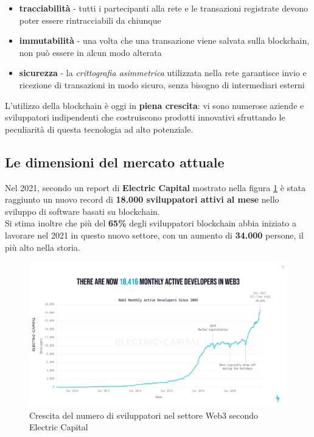 \documentclass[12pt,a4paper]{report}
\begin{document}
\begin{itemize}
  \item \textbf{tracciabilità} - tutti i partecipanti alla rete e le transazioni registrate devono poter essere rintracciabili da chiunque
  \item \textbf{immutabilità} - una volta che una transazione viene salvata sulla blockchain, non può essere in alcun modo alterata
  \item \textbf{sicurezza} - la \textit{crittografia asimmetrica} utilizzata nella rete garantisce invio e ricezione di transazioni in modo sicuro, senza bisogno di intermediari esterni
\end{itemize}

\noindent L'utilizzo della blockchain è oggi in \textbf{piena crescita}: vi sono numerose aziende e sviluppatori indipendenti che costruiscono prodotti innovativi sfruttando le peculiarità di questa tecnologia ad alto potenziale.


\subsection{Le dimensioni del mercato attuale}

\noindent Nel 2021, secondo un report di \textbf{Electric Capital}\cite{web3_dev} mostrato nella figura \ref{fig:web3_dev} è stata raggiunto un nuovo record di \textbf{18.000 sviluppatori attivi al mese} nello sviluppo di software basati su blockchain. \\Si stima inoltre che più del \textbf{65\%} degli sviluppatori blockchain abbia iniziato a lavorare nel 2021 in questo nuovo settore, con un aumento di \textbf{34.000} persone, il più alto nella storia.

\begin{figure}[H]
  \includegraphics[scale=0.3]{web3_dev.png}
  \centering
  \caption{Crescita del numero di sviluppatori nel settore Web3 secondo Electric Capital}
  \label{fig:web3_dev}
\end{figure}
\end{document}
